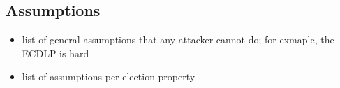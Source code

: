 \subsection{Assumptions} \label{sec: assumptions}

\begin{itemize}
    \item list of general assumptions that any attacker cannot do; for exmaple, the ECDLP is hard
    \item list of assumptions per election property
\end{itemize}
